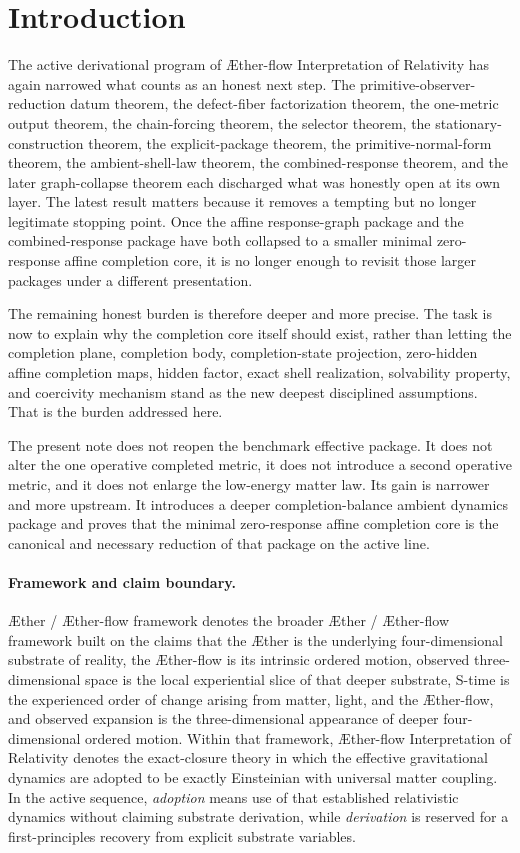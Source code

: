 \documentclass[11pt]{article}
\newcommand{\Aether}{\AE{}ther}
\newcommand{\Aflow}{\AE{}ther-flow}
\newcommand{\TheoryName}{\Aflow{} Interpretation of Relativity}
\newcommand{\TheoryProgram}{\Aether{} / \Aflow{} framework}
\begin{document}
\section{Introduction}

The active derivational program of \TheoryName{} has again narrowed what counts as an honest next step. The primitive-observer-reduction datum theorem, the defect-fiber factorization theorem, the one-metric output theorem, the chain-forcing theorem, the selector theorem, the stationary-construction theorem, the explicit-package theorem, the primitive-normal-form theorem, the ambient-shell-law theorem, the combined-response theorem, and the later graph-collapse theorem each discharged what was honestly open at its own layer. The latest result matters because it removes a tempting but no longer legitimate stopping point. Once the affine response-graph package and the combined-response package have both collapsed to a smaller minimal zero-response affine completion core, it is no longer enough to revisit those larger packages under a different presentation.

The remaining honest burden is therefore deeper and more precise. The task is now to explain why the completion core itself should exist, rather than letting the completion plane, completion body, completion-state projection, zero-hidden affine completion maps, hidden factor, exact shell realization, solvability property, and coercivity mechanism stand as the new deepest disciplined assumptions. That is the burden addressed here.

The present note does not reopen the benchmark effective package. It does not alter the one operative completed metric, it does not introduce a second operative metric, and it does not enlarge the low-energy matter law. Its gain is narrower and more upstream. It introduces a deeper completion-balance ambient dynamics package and proves that the minimal zero-response affine completion core is the canonical and necessary reduction of that package on the active line.

\paragraph{Framework and claim boundary.}
\TheoryProgram{} denotes the broader \Aether{} / \Aflow{} framework built on the claims that the \Aether{} is the underlying four-dimensional substrate of reality, the \Aflow{} is its intrinsic ordered motion, observed three-dimensional space is the local experiential slice of that deeper substrate, S-time is the experienced order of change arising from matter, light, and the \Aflow{}, and observed expansion is the three-dimensional appearance of deeper four-dimensional ordered motion. Within that framework, \TheoryName{} denotes the exact-closure theory in which the effective gravitational dynamics are adopted to be exactly Einsteinian with universal matter coupling. In the active sequence, \emph{adoption} means use of that established relativistic dynamics without claiming substrate derivation, while \emph{derivation} is reserved for a first-principles recovery from explicit substrate variables.
\end{document}
